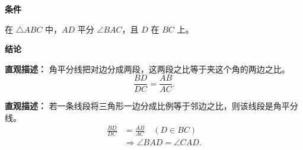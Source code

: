 \begin{statementbox}

	\textbf{\textcolor{CStatement}{条件}}
	\begin{description}[style=nextline, leftmargin=2.8em, labelsep=0.5em, itemsep=0.35em]
		\item[\textbf{\textcolor{CStatement}{条件 1（角平分线条件）：}}] 在 $\triangle ABC$ 中，$AD$ 平分 $\angle BAC$，且 $D$ 在 $BC$ 上。
	\end{description}

	\textbf{\textcolor{CStatement}{结论}}
	\begin{description}[style=nextline, leftmargin=2.8em, labelsep=0.5em, itemsep=0.45em]
		\item[\textbf{\textcolor{CStatement}{结论一（比例关系）：}}]
			\textbf{\textcolor{CStatement}{直观描述：}}
			角平分线把对边分成两段，这两段之比等于夹这个角的两边之比。
			\[
				\frac{BD}{DC} = \frac{AB}{AC}.
			\]

		\item[\textbf{\textcolor{CStatement}{推广结论（逆定理判定）：}}]
			\textbf{\textcolor{CStatement}{直观描述：}}
			若一条线段将三角形一边分成比例等于邻边之比，则该线段是角平分线。
			\[
				\begin{aligned}
					\frac{BD}{DC} &= \frac{AB}{AC} \quad (D\in BC)\\
					&\Longrightarrow \angle BAD = \angle CAD.
			\end{aligned}
			\]
	\end{description}

\end{statementbox}
